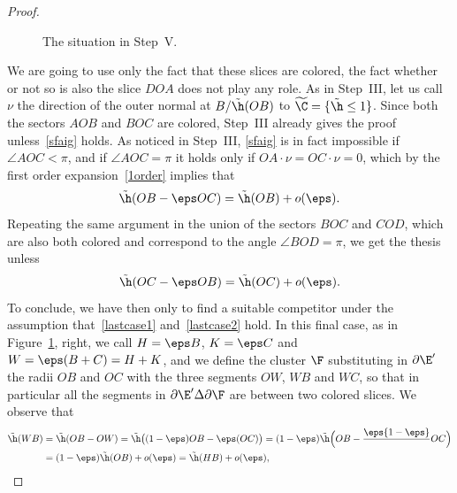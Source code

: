 \begin{proof}
\begin{figure}[htbp]
\caption{The situation in Step~V.}\label{Figstep5}
\end{figure}
We are going to use only the fact that these slices are colored, the fact whether or not so is also the slice $DOA$ does not play any role. As in Step~III, let us call $\nu$ the direction of the outer normal at $B/\tilde\h(OB)$ to $\widetilde\C=\{\tilde\h\leq 1\}$. Since both the sectors $AOB$ and $BOC$ are colored, Step~III already gives the proof unless~\eqref{sfaig} holds. As noticed in Step~III, \eqref{sfaig} is in fact impossible if $\angle AOC<\pi$, and if $\angle AOC=\pi$ it holds only if $OA\cdot \nu =OC\cdot \nu=0$, which by the first order expansion~\eqref{1order} implies that
\begin{equation}\label{lastcase1}
\tilde\h(OB-\eps OC)=\tilde\h(OB)+o(\eps).
\end{equation}
Repeating the same argument in the union of the sectors $BOC$ and $COD$, which are also both colored and correspond to the angle $\angle BOD=\pi$, we get the thesis unless
\begin{equation}\label{lastcase2}
\tilde\h(OC-\eps OB) = \tilde\h(OC)+o(\eps).
\end{equation}
To conclude, we have then only to find a suitable competitor under the assumption that~\eqref{lastcase1} and~\eqref{lastcase2} hold. In this final case, as in Figure~\ref{Figstep5}, right, we call $H=\eps B$, $K=\eps C$ and $W=\eps(B+C)=H+K$, and we define the cluster $\F$ substituting in $\partial\E'$ the radii $OB$ and $OC$ with the three segments $OW$, $WB$ and $WC$, so that in particular all the segments in $\partial\E'\Delta\partial\F$ are between two colored slices. We observe that
\[\begin{split}
\tilde\h(WB) &= \tilde\h(OB-OW) = \tilde\h\big((1-\eps)OB - \eps(OC)\big)
=(1-\eps) \tilde\h\Bigl(OB - \frac \eps{1-\eps}\, OC\Bigr)\\
&=(1-\eps) \tilde\h(OB) +o(\eps) = \tilde\h(HB)+o(\eps),

\end{split}\]
\end{proof}
